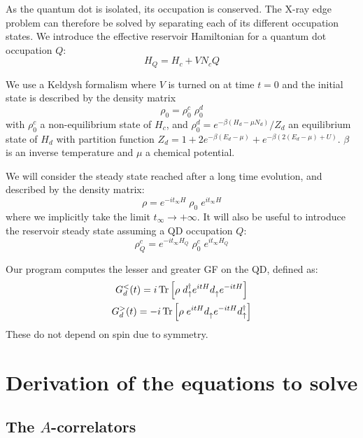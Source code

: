 \documentclass[12pt]{article}
\newcommand\up{\uparrow}
\newcommand\nodag{{\vphantom{\dagger}}}
\begin{document}
As the quantum dot is isolated, its occupation is conserved. The X-ray edge problem can therefore be solved by separating each of its different occupation states\cite{NozieresDeDominicis1969}.
We introduce the effective reservoir Hamiltonian for a quantum dot occupation $Q$:
\begin{equation}
	H_Q = H_c + V N_c Q
\end{equation}


We use a Keldysh formalism where $V$ is turned on at time $t=0$ and the initial state is described by the density matrix
\begin{equation}
	\rho_0 = \rho_0^c \; \rho_0^d
\end{equation}
with $\rho_0^c$ a non-equilibrium state of $H_c$, and $\rho_0^d = e^{-\beta(H_d - \mu N_d)} / Z_d$ an equilibrium state of $H_d$ with partition function $Z_d = 1 + 2e^{-\beta(E_d - \mu)} + e^{-\beta(2(E_d - \mu) + U)}$.
$\beta$ is an inverse temperature and $\mu$ a chemical potential.

We will consider the steady state reached after a long time evolution, and described by the density matrix:
\begin{equation}
	\label{eq:steady_state}
	\rho = e^{-it_\infty H} \;\rho_0\; e^{it_\infty H}
\end{equation}
where we implicitly take the limit $t_\infty \rightarrow +\infty$.
It will also be useful to introduce the reservoir steady state assuming a \ac{QD} occupation $Q$:
\begin{equation}
	\label{eq:steady_state_Q}
	\rho_Q^c = e^{-it_\infty H_Q} \;\rho_0^c\; e^{it_\infty H_Q}
\end{equation}

Our program computes the lesser and greater \ac{GF} on the \ac{QD}, defined as:
\begin{subequations}
	\begin{gather}
		G^<_d(t) = i\Tr \qty[\rho \; d_\up^\dagger e^{itH} d_\up^\nodag e^{-itH}]
		\\
		G^>_d(t) = -i\Tr \qty[\rho \; e^{itH} d_\up^\nodag e^{-itH} d_\up^\dagger]
	\end{gather}
\end{subequations}
These do not depend on spin due to symmetry.

\section{Derivation of the equations to solve}

\subsection{The $A$-correlators}
\end{document}
